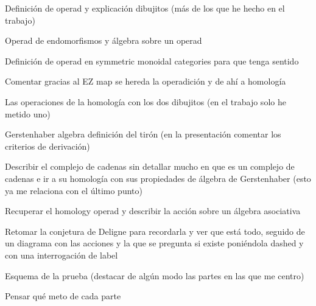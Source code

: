 \documentclass{beamer}
\theoremstyle{definition}
\begin{document}
\begin{frame}
	Definición de operad y explicación dibujitos (más de los que he hecho en el trabajo)
	
	Operad de endomorfismos y álgebra sobre un operad
	
	Definición de operad en symmetric monoidal categories para que tenga sentido
	
	Comentar gracias al EZ map se hereda la operadición y de ahí a homología
	
	Las operaciones de la homología con los dos dibujitos (en el trabajo solo he metido uno)
	
	Gerstenhaber algebra definición del tirón (en la presentación comentar los criterios de derivación)
	
	Describir el complejo de cadenas sin detallar mucho en que es un complejo de cadenas e ir a su homología con sus propiedades de álgebra de Gerstenhaber (esto ya me relaciona con el último punto)
	
	Recuperar el homology operad y describir la acción sobre un álgebra asociativa
\end{frame}

\begin{frame}
	Retomar la conjetura de Deligne para recordarla y ver que está todo, seguido de un diagrama con las acciones y la que se pregunta si existe poniéndola dashed y con una interrogación de label
	
	Esquema de la prueba (destacar de algún modo las partes en las que me centro)
	
	Pensar qué meto de cada parte
\end{frame}
\end{document}
